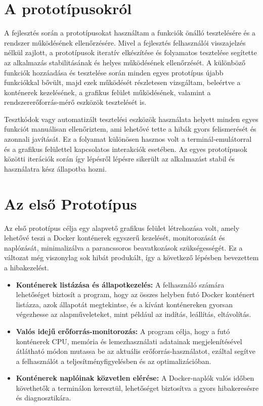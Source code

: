
\section{A prototípusokról}
A fejlesztés során a prototípusokat használtam a funkciók önálló tesztelésére és a rendszer működésének ellenőrzésére. Mivel a fejlesztés felhasználói visszajelzés nélkül zajlott, a prototípusok iteratív elkészítése és folyamatos tesztelése segítette az alkalmazás stabilitásának és helyes működésének ellenőrzését. A különböző funkciók hozzáadása és tesztelése során minden egyes prototípus újabb funkciókkal bővült, majd ezek működését részletesen vizsgáltam, beleértve a konténerek kezelésének, a grafikus felület működésének, valamint a rendszererőforrás-mérő eszközök tesztelését is.

Tesztkódok vagy automatizált tesztelési eszközök használata helyett minden egyes funkciót manuálisan ellenőriztem, ami lehetővé tette a hibák gyors felismerését és azonnali javítását. Ez a folyamat különösen hasznos volt a terminál-emulátorral és a grafikus felülettel kapcsolatos interakciók esetében. Az egyes prototípusok közötti iterációk során így lépésről lépésre sikerült az alkalmazást stabil és használatra kész állapotba hozni.


\section{Az első Prototípus}

Az első prototípus célja egy alapvető grafikus felület létrehozása volt, amely lehetővé teszi a Docker konténerek egyszerű kezelését, monitorozását és naplózását, minimalizálva a parancssoros beavatkozások szükségességét. Ez a változat még viszonylag sok hibát produkált, így a következő lépésben bevezettem a hibakezelést.

\begin{itemize}
	\item \textbf{Konténerek listázása és állapotkezelés:} A felhasználó számára lehetőséget biztosít a program, hogy az összes helyben futó Docker konténert listázza, azok állapotát megtekintse, és a kívánt konténereken gyorsan végezhesse az alapműveleteket, mint például az indítás, leállítás, eltávolítás.
	\item \textbf{Valós idejű erőforrás-monitorozás:} A program célja, hogy a futó konténerek CPU, memória és lemezhasználati adatainak megjelenítésével átlátható módon mutassa be az aktuális erőforrás-használatot, ezáltal segítve a felhasználót a teljesítményfigyelésben és az optimalizációban.
	\item \textbf{Konténerek naplóinak közvetlen elérése:} A Docker-naplók valós időben követhetők a terminálon keresztül, lehetőséget biztosítva a gyors hibakeresésre és diagnosztikára.
\end{itemize}

